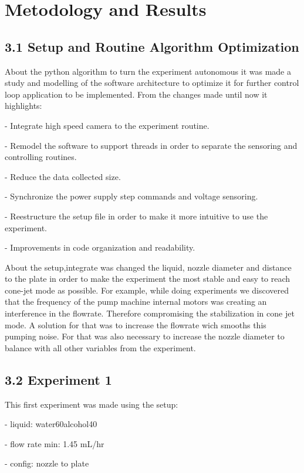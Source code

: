\section{Metodology and Results}

\subsection*{3.1 Setup and Routine Algorithm Optimization}

    About the python algorithm to turn the experiment autonomous it was made a study and modelling of the software architecture to optimize it 
    for further control loop application to be implemented.
    From the changes made until now it highlights:

    - Integrate high speed camera to the experiment routine.

    - Remodel the software to support threads in order to separate the sensoring and controlling routines.

    - Reduce the data collected size. 

    - Synchronize the power supply step commands and voltage sensoring. 

    - Reestructure the setup file in order to make it more intuitive to use the experiment. 

    - Improvements in code organization and readability.

    About the setup,integrate was changed the liquid, nozzle diameter and distance to the plate in order to make the experiment 
    the most stable and easy to reach cone-jet mode as possible.
    For example, while doing experiments we discovered that the frequency of the pump machine internal motors was
    creating an interference in the flowrate. Therefore compromising the stabilization in cone jet mode.
    A solution for that was to increase the flowrate wich smooths this pumping noise. For that was also necessary
    to increase the nozzle diameter to balance with all other variables from the experiment.


\subsection*{3.2 Experiment 1}

    This first experiment was made using the setup:

    - liquid: water60alcohol40

    - flow rate min: 1.45 mL/hr

    - config: nozzle to plate

